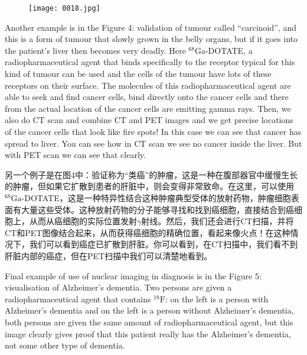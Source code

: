 \documentclass[dvipsnames, svgnames,a4paper,11pt]{article}
\begin{document}
\begin{figure}[htbp]
      \centering
      \texttt{[image: 0018.jpg]}
       \label{fig4}
  \end{figure}

Another example is in the Figure 4: validation of tumour called “carcinoid”, and this is a form of tumour that slowly grown in the belly organs, but if it goes into the patient’s liver then becomes very deadly. Here ${}^\text{68}\text{Ga}$-DOTATE, a radiopharmaceutical agent that binds specifically to the receptor typical for this kind of tumour can be used and the cells of the tumour have lots of these receptors on their surface. The molecules of this radiopharmaceutical agent are able to seek and find cancer cells, bind directly onto the cancer cells and there from the actual location of the cancer cells are emitting gamma rays. Then, we also do CT scan and combine CT and PET images and we get precise locations of the cancer cells that look like fire spots! In this case we can see that cancer has spread to liver. You can see how in CT scan we see no cancer inside the liver. But with PET scan we can see that clearly.

另一个例子是在图4中：验证称为“类癌”的肿瘤，这是一种在腹部器官中缓慢生长的肿瘤，但如果它扩散到患者的肝脏中，则会变得非常致命。在这里，可以使用${}^\text{68}\text{Ga}$-DOTATE，这是一种特异性结合这种肿瘤典型受体的放射药物，肿瘤细胞表面有大量这些受体。这种放射药物的分子能够寻找和找到癌细胞，直接结合到癌细胞上，从而从癌细胞的实际位置发射$\gamma$射线。然后，我们还会进行CT扫描，并将CT和PET图像结合起来，从而获得癌细胞的精确位置，看起来像火点！在这种情况下，我们可以看到癌症已扩散到肝脏。你可以看到，在CT扫描中，我们看不到肝脏内部的癌症，但在PET扫描中我们可以清楚地看到。

Final example of use of nuclear imaging in diagnosis is in the Figure 5: visualisation of Alzheimer’s dementia. Two persons are given a radiopharmaceutical agent that contains ${}^{18}\text{F}$: on the left is a person with Alzheimer’s dementia and on the left is a person without Alzheimer’s dementia, both persons are given the same amount of radiopharmaceutical agent, but this image clearly gives proof that this patient really has the Alzheimer’s dementia, not some other type of dementia.
\end{document}
